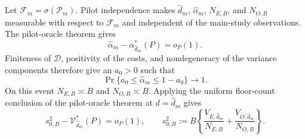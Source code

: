 Let \(\mathcal F_m=\sigma(\mathcal P_m)\).  Pilot independence makes \(\widehat d_m\), \(\widehat\alpha_m\), \(N_{E,B}\), and \(N_{O,B}\) measurable with respect to \(\mathcal F_m\) and independent of the main-study observations.  The pilot-oracle theorem gives
\[
 \widehat\alpha_m-\alpha_{\widehat d_m}^*(P)=o_P(1).
\]
Finiteness of \(\mathcal D\), positivity of the costs, and nondegeneracy of the variance components therefore give an \(a_0>0\) such that
\[
 \Pr\{a_0\le\widehat\alpha_m\le1-a_0\}\longrightarrow1. \tag{1}
\]
On this event \(N_{E,B}\asymp B\) and \(N_{O,B}\asymp B\).  Applying the uniform floor-count conclusion of the pilot-oracle theorem at \(d=\widehat d_m\) gives
\[
 s_{0,B}^2-\mathcal V_{\widehat d_m}^*(P)=o_P(1),\qquad
 s_{0,B}^2:=B\left\{\frac{V_{E,\widehat d_m}}{N_{E,B}}
 +\frac{V_{O,\widehat d_m}}{N_{O,B}}\right\}. \tag{2}
\]

